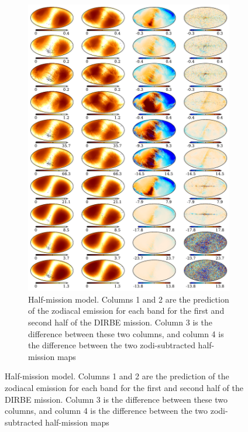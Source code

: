 \documentclass{aa}
\begin{document}
\begin{figure}
\begin{figure}
	\centering
	\includegraphics[width=0.8\linewidth]{figs/zodi_diff.pdf}
	\caption{Half-mission model. Columns 1 and 2 are the prediction of the zodiacal emission for each band for the first and second half of the DIRBE mission. Column 3 is the difference between these two columns, and column 4 is the difference between the two zodi-subtracted half-mission maps}
	\label{fig: zodi_HM}
\end{figure}


\end{figure}
\end{document}
